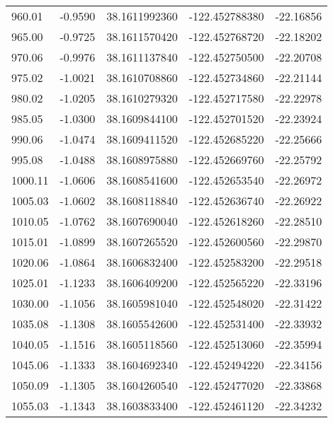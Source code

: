 \begin{longtable}{p{2.5cm}p{2.5cm}p{3cm}p{3cm}p{2.5cm}}
       960.01  & 	-0.9590 &               38.1611992360  &   -122.452788380	&   -22.16856 \\
       965.00  & 	-0.9725 &               38.1611570420  &   -122.452768720	&   -22.18202 \\
       970.06  & 	-0.9976 &               38.1611137840  &   -122.452750500	&   -22.20708 \\
       975.02  & 	-1.0021 &               38.1610708860  &   -122.452734860   &	-22.21144 \\
       980.02  & 	-1.0205 &               38.1610279320  &   -122.452717580   &	-22.22978 \\
       985.05  & 	-1.0300 &               38.1609844100  &   -122.452701520   &	-22.23924 \\
       990.06  & 	-1.0474 &               38.1609411520  &   -122.452685220   &	-22.25666 \\
       995.08  & 	-1.0488 &               38.1608975880  &   -122.452669760   &	-22.25792 \\
      1000.11  & 	-1.0606 &               38.1608541600  &   -122.452653540   &	-22.26972 \\
      1005.03  & 	-1.0602 &               38.1608118840  &   -122.452636740   &	-22.26922 \\
      1010.05  & 	-1.0762 &               38.1607690040  &   -122.452618260   &	-22.28510 \\
      1015.01  & 	-1.0899 &               38.1607265520  &   -122.452600560   &	-22.29870 \\
      1020.06  & 	-1.0864 &               38.1606832400  &   -122.452583200   &	-22.29518 \\
      1025.01  & 	-1.1233 &               38.1606409200  &   -122.452565220   &	-22.33196 \\
      1030.00  & 	-1.1056 &               38.1605981040  &   -122.452548020   &	-22.31422 \\
      1035.08  & 	-1.1308 &               38.1605542600  &   -122.452531400   &	-22.33932 \\
      1040.05  & 	-1.1516 &               38.1605118560  &   -122.452513060   &	-22.35994 \\
      1045.06  & 	-1.1333 &               38.1604692340  &   -122.452494220   &	-22.34156 \\
      1050.09  & 	-1.1305 &               38.1604260540  &   -122.452477020   &	-22.33868 \\
      1055.03  & 	-1.1343 &               38.1603833400  &   -122.452461120   &	-22.34232 \\

\end{longtable}
